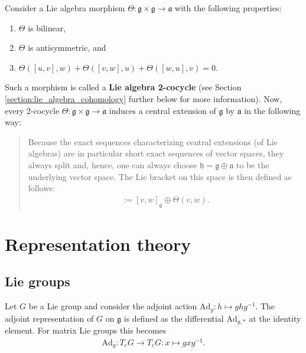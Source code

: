     \begin{construct}\label{lie:cocycle}
        Consider a Lie algebra morphism $\Theta:\mathfrak{g}\times\mathfrak{g}\rightarrow\mathfrak{a}$ with the following properties:
        \begin{enumerate}
            \item $\Theta$ is bilinear,
            \item $\Theta$ is antisymmetric, and
            \item $\Theta([u,v],w) + \Theta([v,w],u) + \Theta([w,u],v) = 0$.
        \end{enumerate}
        Such a morphism is called a \textbf{Lie algebra 2-cocycle} (see Section \ref{section:lie_algebra_cohomology} further below for more information). Now, every 2-cocycle $\Theta:\mathfrak{g}\times\mathfrak{g}\rightarrow\mathfrak{a}$ induces a central extension of $\mathfrak{g}$ by $\mathfrak{a}$ in the following way:
        \begin{quote}
            Because the exact sequences characterizing central extensions (of Lie algebras) are in particular short exact sequences of vector spaces, they always split and, hence, one can always choose $\mathfrak{h}=\mathfrak{g}\oplus\mathfrak{a}$ to be the underlying vector space. The Lie bracket on this space is then defined as follows:
            \begin{gather}
                [v\oplus\lambda,w\oplus\mu] := [v,w]_{\mathfrak{g}}\oplus\Theta(v,w).
            \end{gather}
        \end{quote}
    \end{construct}

\section{Representation theory}
\subsection{Lie groups}


    \begin{example}\label{lie:adjoint_representation}
        Let $G$ be a Lie group and consider the adjoint action $\mathrm{Ad}_g:h\mapsto ghg^{-1}$. The adjoint representation of $G$ on $\mathfrak{g}$ is defined as the differential $\mathrm{Ad}_{g,*}$ at the identity element. For matrix Lie groups this becomes
        \begin{gather}
            \mathrm{Ad}_g:T_eG\rightarrow T_eG:x\mapsto gxg^{-1}.
        \end{gather}
    \end{example}

